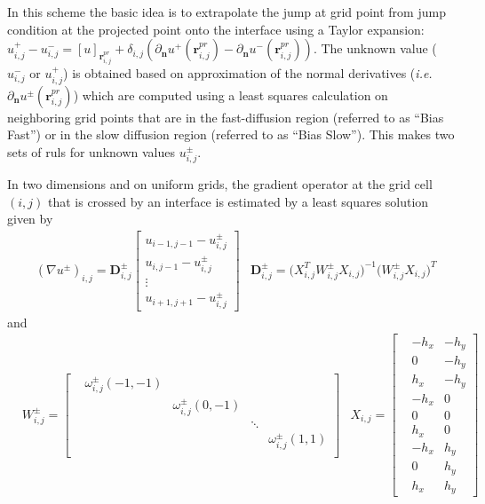 \documentclass{elsarticle}
\begin{document}
In this scheme the basic idea is to extrapolate the jump at grid point from jump condition at the projected point onto the interface using a Taylor expansion: $u^+_{i,j} - u^-_{i,j}=[u]_{\mathbf{r}_{i,j}^{pr}} + \delta_{i,j}(\partial_\mathbf{n}u^+(\mathbf{r}^{pr}_{i,j}) - \partial_\mathbf{n}u^-(\mathbf{r}^{pr}_{i,j})) $. The unknown value ($u^-_{i,j}$ or $u^+_{i,j}$) is obtained based on approximation of the normal derivatives (\textit{i.e.} $\partial_\mathbf{n}u^\pm(\mathbf{r}^{pr}_{i,j})$) which are computed using a least squares calculation on neighboring grid points that are in the fast-diffusion region (referred to as ``Bias Fast'') or in the slow diffusion region (referred to as ``Bias Slow''). This makes two sets of ruls for unknown values $u^\pm_{i,j}$. 

In two dimensions and on uniform grids, the gradient operator at the grid cell $(i,j)$ that is crossed by an interface is estimated by a least squares solution given by
\begin{align*}
&(\nabla u^\pm)_{i,j} = \mathbf{D}^\pm_{i,j} \begin{bmatrix}
u_{i-1,j-1} - u^\pm_{i,j}\\
u_{i,j-1} - u^\pm_{i,j}\\
\vdots \\
u_{i+1,j+1} - u^\pm_{i,j}
\end{bmatrix} &\mathbf{D}^\pm_{i,j} = \big(X^T_{i,j} W^\pm_{i,j} X_{i,j} \big)^{-1} \big( W^\pm_{i,j} X_{i,j} \big)^T
\end{align*}
and 
\begin{align*}
& W^\pm_{i,j} = \begin{bmatrix}
&\omega^\pm_{i,j} (-1,-1) &  &  & \\
& &\omega^\pm_{i,j} (0,-1)  &  & \\
& &  & \ddots & \\
&&  &  & \omega^\pm_{i,j} (1,1) \\
\end{bmatrix}    & X_{i,j} = \begin{bmatrix}
& -h_x  & -h_y \\
& 0  & -h_y \\
& h_x  & -h_y \\
& -h_x  & 0 \\
& 0   & 0 \\
& h_x  & 0\\
&-h_x  & h_y\\
&0  & h_y\\
&h_x  & h_y
\end{bmatrix}
\end{align*}
\end{document}
